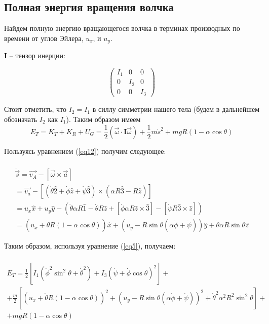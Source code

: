 \documentclass[a4paper,11.5pt]{article} %
\begin{document}
\subsection{Полная энергия вращения волчка}

Найдем полную энергию вращающегося волчка в терминах производных по времени от углов Эйлера, $u_x$, и $u_y$.

$\textbf{I}$ -- тензор инерции:

\begin{equation}
	\begin{pmatrix}
		I_1 & 0 & 0\\
		0 & I_2 & 0\\
		0 & 0 & I_3
	\end{pmatrix}
	\label{eq18}
\end{equation}

Стоит отметить, что $I_2 = I_1$ в силлу симметрии нашего тела (будем в дальнейшем обозначать $I_2$ как $I_1$). Таким образом имеем 
\begin{equation}
	E_T = K_T + K_R + U_G = \frac{1}{2}(\overrightarrow{\omega} \cdot \textbf{I}\overrightarrow{\omega}) + \frac{1}{2}m\dot{s}^2 	+ mgR(1 - \alpha \cos\theta)
	\label{eq19}
\end{equation}

Пользуясь уравнением (\ref{eq12}) получим следующее:

\begin{multline}
	\\
	\dot{\vec{s}} = \overrightarrow{v_A} - \left[\overrightarrow{\omega} \times \vec{a}\right]
	\\
	= \overrightarrow{v_a} - \left[(\dot{\theta}\hat{2} + \dot{\phi}\hat{z} + \dot{\psi}\hat{3})\times(\alpha R \hat{3} - R\hat{z})\right]
	\\
	= u_x\hat{x} + u_y\hat{y} - (\dot{\theta}\alpha R \hat{1} - \dot{\theta}R\hat{z} + \left[\dot{\phi}\alpha R \hat{z} \times \hat{3}\right] - \left[\dot{\psi} R \hat{3} \times \hat{z}\right])
	\\
	= (u_x + \dot{\theta}R(1 - \alpha \cos \theta))\hat{x} + (u_y - R\sin \theta(\alpha \dot{\phi} + \dot{\psi}))\hat{y} + \dot{\theta}\alpha R \sin \theta 		\hat{z}
	\label{eq20}
\end{multline}

Таким образом, используя уравнение (\ref{eq5}), получаем:

\begin{multline}
	\\
	E_T = \frac{1}{2}\left[ I_1(\dot{\phi}^2\sin^2\theta + \dot{\theta}^2) + 			I_3(\dot{\psi} + \dot{\phi}\cos \theta)^2 \right] +
	\\
+ \frac{m}{2}\left[ \left(u_x + \dot{\theta}R(1 - \alpha\cos \theta)\right)^2 + \left(u_y - R\sin\theta (\alpha \dot{\phi} + \dot{\psi})\right)^2 + \dot{\theta}^2\alpha^2R^2\sin^2\theta \right] + 
\\
+ mgR(1 - \alpha\cos \theta)
	\label{eq21}
\end{multline}
\end{document}
